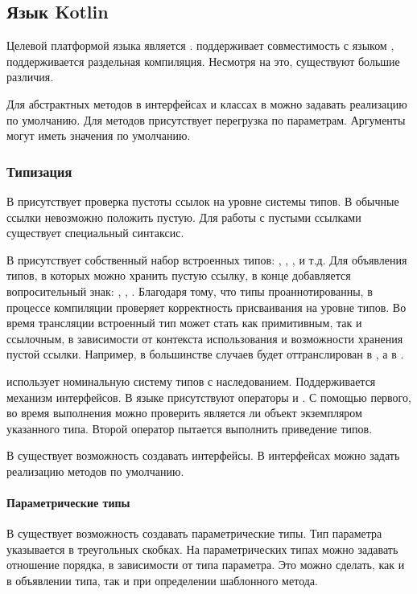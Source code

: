 \subsection{Язык Kotlin}

Целевой платформой языка  является .  поддерживает совместимость с языком  \cite{kotlin:compatibility}, поддерживается раздельная компиляция. Несмотря на это, существуют большие различия.

Для абстрактных методов в интерфейсах и классах в  можно задавать реализацию по умолчанию. Для методов присутствует перегрузка по параметрам. Аргументы могут иметь значения по умолчанию.

\subsubsection{Типизация}
В  присутствует проверка пустоты ссылок на уровне системы типов. В обычные ссылки невозможно положить пустую. Для работы с пустыми ссылками существует специальный синтаксис.

В  присутствует собственный набор встроенных типов: , , , и т.д. Для объявления типов, в которых можно хранить пустую ссылку, в конце добавляется вопросительный знак: , , . Благодаря тому, что типы проаннотированны, в процессе компиляции  проверяет корректность присваивания на уровне типов. Во время трансляции встроенный тип может стать как примитивным, так и ссылочным, в зависимости от контекста использования и возможности хранения пустой ссылки. Например, в большинстве случаев  будет оттранслирован в , а  в .

 использует номинальную систему типов с наследованием. Поддерживается механизм интерфейсов. В языке присутствуют операторы  и . С помощью первого, во время выполнения можно проверить является ли объект экземпляром указанного типа. Второй оператор пытается выполнить приведение типов.

В  существует возможность создавать интерфейсы. В интерфейсах можно задать реализацию методов по умолчанию.

\paragraph{Параметрические типы}
В  существует возможность создавать параметрические типы. Тип параметра указывается в треугольных скобках. На параметрических типах можно задавать отношение порядка, в зависимости от типа параметра. Это можно сделать, как и в объявлении типа, так и при определении шаблонного метода.
